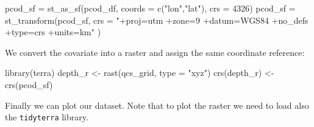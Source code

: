 \documentclass[
  letterpaper,
  DIV=11,
  numbers=noendperiod]{scrartcl}
\newenvironment{Shaded}{\begin{snugshade}}{\end{snugshade}}
\newcommand{\AttributeTok}[1]{\textcolor[rgb]{0.40,0.45,0.13}{#1}}
\newcommand{\DecValTok}[1]{\textcolor[rgb]{0.68,0.00,0.00}{#1}}
\newcommand{\FunctionTok}[1]{\textcolor[rgb]{0.28,0.35,0.67}{#1}}
\newcommand{\NormalTok}[1]{\textcolor[rgb]{0.00,0.23,0.31}{#1}}
\newcommand{\OtherTok}[1]{\textcolor[rgb]{0.00,0.23,0.31}{#1}}
\newcommand{\SpecialCharTok}[1]{\textcolor[rgb]{0.37,0.37,0.37}{#1}}
\newcommand{\StringTok}[1]{\textcolor[rgb]{0.13,0.47,0.30}{#1}}
\begin{document}
\begin{Shaded}
\begin{Highlighting}[]
\NormalTok{pcod\_sf }\OtherTok{=}   \FunctionTok{st\_as\_sf}\NormalTok{(pcod\_df, }\AttributeTok{coords =} \FunctionTok{c}\NormalTok{(}\StringTok{"lon"}\NormalTok{,}\StringTok{"lat"}\NormalTok{), }\AttributeTok{crs =} \DecValTok{4326}\NormalTok{)}
\NormalTok{pcod\_sf }\OtherTok{=} \FunctionTok{st\_transform}\NormalTok{(pcod\_sf,}
                       \AttributeTok{crs =} \StringTok{"+proj=utm +zone=9 +datum=WGS84 +no\_defs +type=crs +units=km"}\NormalTok{ )}
\end{Highlighting}
\end{Shaded}

We convert the covariate into a raster and assign the same coordinate
reference:

\begin{Shaded}
\begin{Highlighting}[]
\FunctionTok{library}\NormalTok{(terra)}
\NormalTok{depth\_r }\OtherTok{\textless{}{-}} \FunctionTok{rast}\NormalTok{(qcs\_grid, }\AttributeTok{type =} \StringTok{"xyz"}\NormalTok{)}
\FunctionTok{crs}\NormalTok{(depth\_r) }\OtherTok{\textless{}{-}} \FunctionTok{crs}\NormalTok{(pcod\_sf)}
\end{Highlighting}
\end{Shaded}

Finally we can plot our dataset. Note that to plot the raster we need to
load also the \texttt{tidyterra} library.

\begin{Shaded}
\end{Shaded}
\end{document}
